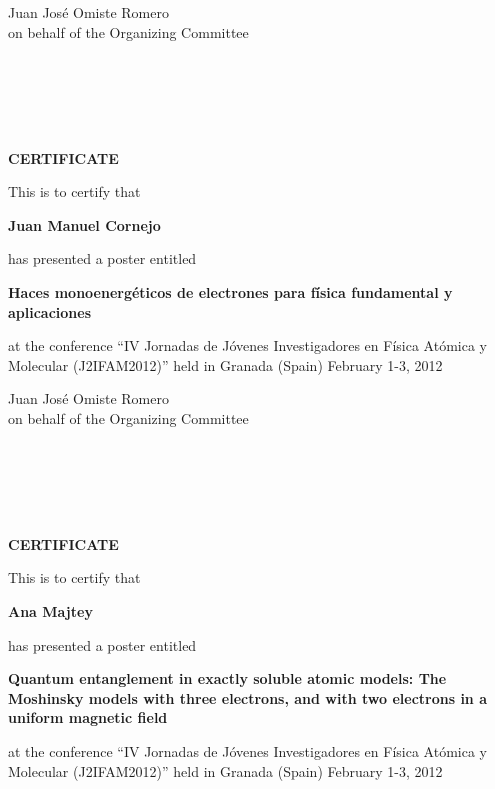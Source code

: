 \documentclass [13pt,a4paper] {letter}
\begin{document}
\vspace {3cm}
\begin{raggedleft}
Juan José Omiste Romero \\
on behalf of the Organizing Committee
\newpage
\end{raggedleft}
\begin{verbatim}





\end{verbatim}
\pagestyle{empty}
\begin{center}
{\bf {\Huge CERTIFICATE}}

\vspace {1.5cm}
This is to certify that
\vspace {1cm}

{\bf \Large  Juan  Manuel  Cornejo }
\vspace {1cm}

has presented a poster entitled
\vspace {1cm}

{\bf \large  Haces monoenergéticos de electrones para física fundamental y aplicaciones   }
\vspace {1cm}

at the conference { \textquotedblleft IV Jornadas de Jóvenes Investigadores en Física Atómica y Molecular (J2IFAM2012)\textquotedblright} 
held in Granada (Spain) February 1-3, 2012
\end{center}
\vspace {3cm}
\begin{raggedleft}
Juan José Omiste Romero \\
on behalf of the Organizing Committee
\newpage
\end{raggedleft}
\begin{verbatim}





\end{verbatim}
\pagestyle{empty}
\begin{center}
{\bf {\Huge CERTIFICATE}}

\vspace {1.5cm}
This is to certify that
\vspace {1cm}

{\bf \Large  Ana    Majtey }
\vspace {1cm}

has presented a poster entitled
\vspace {1cm}

{\bf \large  Quantum entanglement in exactly soluble atomic models: The Moshinsky models with three electrons, and with two electrons in a uniform magnetic field  }
\vspace {1cm}

at the conference { \textquotedblleft IV Jornadas de Jóvenes Investigadores en Física Atómica y Molecular (J2IFAM2012)\textquotedblright} 
held in Granada (Spain) February 1-3, 2012
\end{center}
\end{document}
